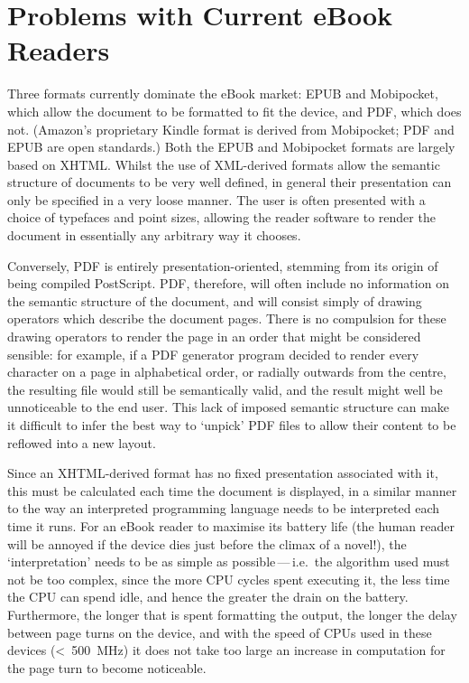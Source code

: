 \documentclass{sig-alternate}
\begin{document}
\section{Problems with Current eBook Readers}
\label{problems}
Three formats currently dominate the eBook market: EPUB and Mobipocket, which allow the document to be formatted to fit the device, and PDF, which does not. (Amazon's proprietary Kindle format is derived from Mobipocket; PDF and EPUB are open standards.) Both the EPUB and Mobipocket formats are largely based on XHTML. Whilst the use of XML-derived formats allow the semantic structure of documents to be very well defined, in general their presentation can only be specified in a very loose manner. The user is often presented with a choice of typefaces and point sizes, allowing the reader software to render the document in essentially any arbitrary way it chooses.

Conversely, PDF is entirely presentation-oriented, stemming from its origin of being compiled PostScript. PDF, therefore, will often include no information on the semantic structure of the document, and will consist simply of drawing operators which describe the document pages. There is no compulsion for these drawing operators to render the page in an order that might be considered sensible: for example, if a PDF generator program decided to render every character on a page in alphabetical order, or radially outwards from the centre, the resulting file would still be semantically valid, and the result might well be unnoticeable to the end user. This lack of imposed semantic structure can make it difficult to infer the best way to `unpick' PDF files to allow their content to be reflowed into a new layout.

Since an XHTML-derived format has no fixed presentation associated with it, this must be calculated each time the document is displayed, in a similar manner to the way an interpreted programming language needs to be interpreted each time it runs. For an eBook reader to maximise its battery life (the human reader will be annoyed if the device dies just before the climax of a novel!), the `interpretation' needs to be as simple as possible\,---\,i.e.~the algorithm used must not be too complex, since the more CPU cycles spent executing it, the less time the CPU can spend idle, and hence the greater the drain on the battery. Furthermore, the longer that is spent formatting the output, the longer the delay between page turns on the device, and with the speed of CPUs used in these devices (<~500~MHz) it does not take too large an increase in computation for the page turn to become noticeable.
\end{document}
